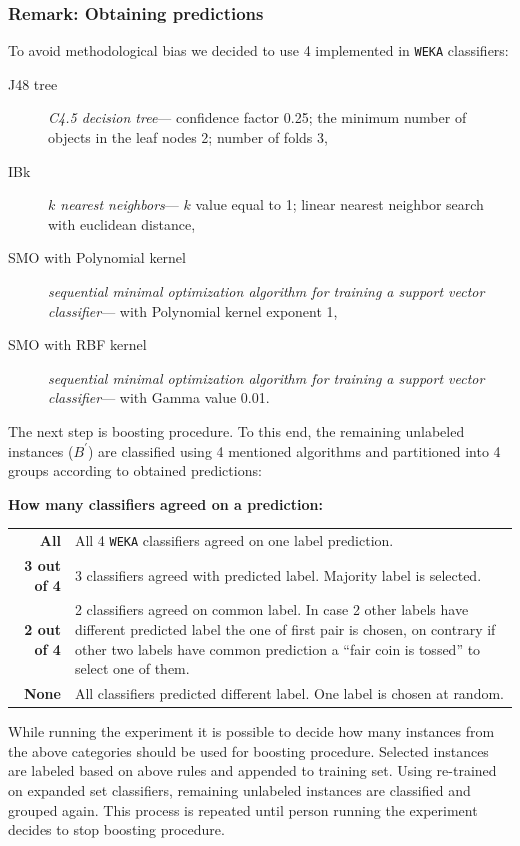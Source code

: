 \documentclass[12pt, a4paper, pdflatex]{report}
\begin{document}
\subsubsection{Remark: Obtaining predictions}
To avoid methodological bias we decided to use 4 implemented in \texttt{WEKA} classifiers:
\begin{description}
\item[J48 tree] \emph{C4.5 decision tree}--- confidence factor 0.25; the minimum number of objects in the leaf nodes 2; number of folds 3,
\item[IBk] \emph{$k$ nearest neighbors}--- $k$ value equal to 1; linear nearest neighbor search with euclidean distance,
\item[SMO with Polynomial kernel] \emph{sequential minimal optimization algorithm for training a support vector classifier}--- with Polynomial kernel exponent 1,
\item[SMO with RBF kernel] \emph{sequential minimal optimization algorithm for training a support vector classifier}--- with Gamma value 0.01.
\end{description}

The next step is boosting procedure. To this end, the remaining unlabeled instances ($B^{\prime}$) are classified using 4 mentioned algorithms and partitioned into 4 groups according to obtained predictions:\\[-0.6cm]
\begin{center}\textbf{How many classifiers agreed on a prediction:}\end{center}
\begin{tabular}{rp{12cm}}
\textbf{All} & All 4 \texttt{WEKA} classifiers agreed on one label prediction.\\
\textbf{3 out of 4} & 3 classifiers agreed with predicted label. Majority label is selected.\\
\textbf{2 out of 4} & 2 classifiers agreed on common label. In case 2 other labels have different predicted label the one of first pair is chosen, on contrary if other two labels have common prediction a ``fair coin is tossed'' to select one of them.\\
\textbf{None} & All classifiers predicted different label. One label is chosen at random.\\[0.4cm]
\end{tabular}

While running the experiment it is possible to decide how many instances from the above categories should be used for boosting procedure. Selected instances are labeled based on above rules and appended to training set. Using re-trained on expanded set classifiers, remaining unlabeled instances are classified and grouped again. This process is repeated until person running the experiment decides to stop boosting procedure.\\
\end{document}
